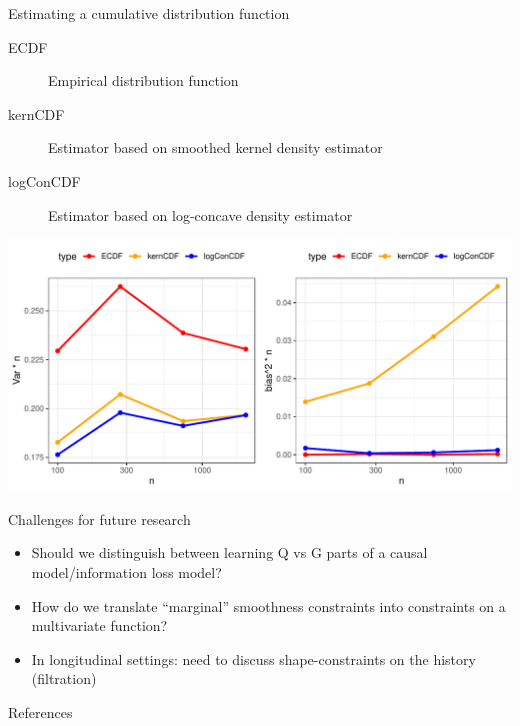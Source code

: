\documentclass[smaller]{beamer}\usepackage{listings}
\begin{document}
\begin{frame}[label={sec:orgfb1215a}]{Estimating a cumulative distribution function}
\small

\begin{description}
\item[{\color{red}ECDF}] Empirical distribution function
\item[{\color{orange}kernCDF}] Estimator based on smoothed kernel density estimator
\item[{\color{blue}logConCDF}] Estimator based on log-concave density estimator
\citep{dumbgen2009maximum,Rufibach_Duembgen_2023}
\end{description}

\includegraphics[width=1\textwidth]{./cdf-estimators.pdf}
\end{frame}


\begin{frame}[label={sec:org7d5017a}]{Challenges for future research}
\begin{itemize}
\item Should we distinguish between learning Q vs G parts of a causal
model/information loss model?

\item How do we translate ``marginal'' smoothness constraints into 
constraints on a multivariate function?

\item In longitudinal settings: need to discuss shape-constraints on the
history (filtration)
\end{itemize}
\end{frame}


\begin{frame}[label={sec:orgf5e37e8}]{References}
\footnotesize 
\end{frame}
\end{document}
